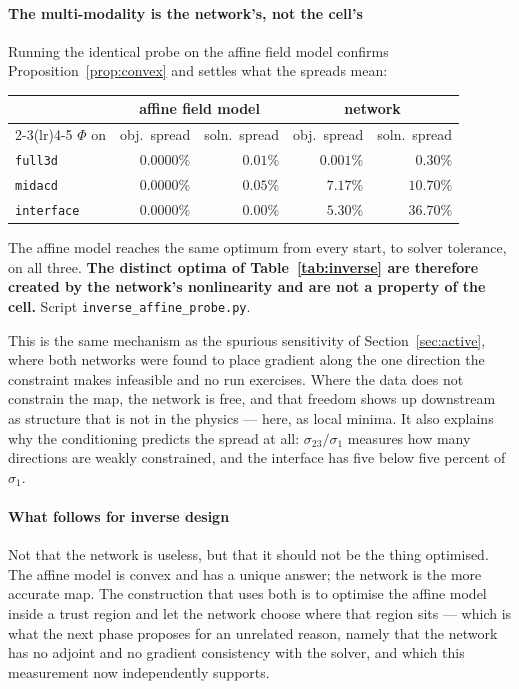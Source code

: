 \documentclass[11pt,a4paper]{article}
\theoremstyle{plain}
\theoremstyle{definition}
\theoremstyle{remark}
\begin{document}
\paragraph{The multi-modality is the network's, not the cell's}
Running the identical probe on the affine field model confirms
Proposition~\ref{prop:convex} and settles what the spreads mean:
\begin{center}
\small
\begin{tabular}{@{}lrrrr@{}}
\toprule
& \multicolumn{2}{c}{affine field model} & \multicolumn{2}{c}{network} \\
\cmidrule(lr){2-3}\cmidrule(lr){4-5}
$\Phi$ on & obj.\ spread & soln.\ spread & obj.\ spread & soln.\ spread \\
\midrule
\texttt{full3d}    & $0.0000\%$ & $0.01\%$ & $0.001\%$ & $0.30\%$ \\
\texttt{midacd}    & $0.0000\%$ & $0.05\%$ & $7.17\%$  & $10.70\%$ \\
\texttt{interface} & $0.0000\%$ & $0.00\%$ & $5.30\%$  & $36.70\%$ \\
\bottomrule
\end{tabular}
\end{center}
The affine model reaches the same optimum from every start, to solver tolerance,
on all three. \textbf{The distinct optima of Table~\ref{tab:inverse} are
therefore created by the network's nonlinearity and are not a property of the
cell.} Script \texttt{inverse\_affine\_probe.py}.

This is the same mechanism as the spurious sensitivity of
Section~\ref{sec:active}, where both networks were found to place gradient along
the one direction the constraint makes infeasible and no run exercises. Where
the data does not constrain the map, the network is free, and that freedom shows
up downstream as structure that is not in the physics --- here, as local minima.
It also explains why the conditioning predicts the spread at all:
$\sigma_{23}/\sigma_1$ measures how many directions are weakly constrained, and
the interface has five below five percent of $\sigma_1$.

\paragraph{What follows for inverse design}
Not that the network is useless, but that it should not be the thing optimised.
The affine model is convex and has a unique answer; the network is the more
accurate map. The construction that uses both is to optimise the affine model
inside a trust region and let the network choose where that region sits ---
which is what the next phase proposes for an unrelated reason, namely that the
network has no adjoint and no gradient consistency with the solver, and which
this measurement now independently supports.
\end{document}

